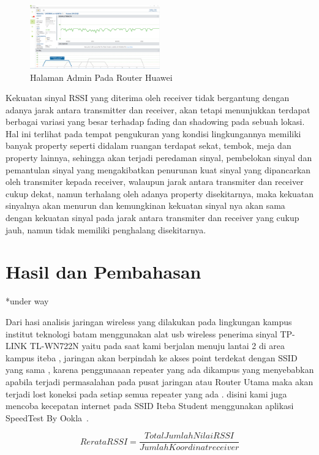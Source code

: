 \documentclass[conference]{IEEEtran}
\begin{document}
\begin{figure}[h]
    \centering
    \includegraphics[width=0.5\textwidth]{signal-strengh.png}
    \caption{Halaman Admin Pada Router Huawei}
\end{figure}

Kekuatan sinyal RSSI yang diterima oleh
receiver tidak bergantung dengan  adanya jarak
antara transmitter dan receiver, akan tetapi
menunjukkan terdapat berbagai variasi yang besar terhadap fading
dan shadowing pada sebuah lokasi. Hal ini
terlihat pada tempat pengukuran yang kondisi
lingkungannya memiliki banyak property seperti
didalam ruangan terdapat sekat, tembok, meja dan 
property lainnya, sehingga akan terjadi peredaman sinyal, pembelokan sinyal dan pemantulan
sinyal yang mengakibatkan penurunan kuat
sinyal yang dipancarkan oleh transmiter kepada
receiver, walaupun jarak antara transmiter dan
receiver cukup dekat, namun terhalang oleh
adanya property disekitarnya, maka kekuatan
sinyalnya akan menurun dan kemungkinan
kekuatan sinyal nya akan sama dengan kekuatan
sinyal pada jarak antara transmiter dan receiver
yang cukup jauh, namun tidak memiliki
penghalang disekitarnya. 

\section{Hasil dan Pembahasan}

*under way

Dari hasi analisis jaringan wireless yang dilakukan pada lingkungan kampus
institut teknologi batam menggunakan alat usb wireless penerima sinyal TP-LINK TL-WN722N yaitu pada saat kami berjalan menuju lantai 2 di area kampus iteba , jaringan akan berpindah
ke akses point terdekat dengan SSID yang sama , karena penggunaaan repeater yang ada dikampus yang menyebabkan apabila terjadi permasalahan
pada pusat jaringan atau Router Utama maka akan terjadi lost koneksi pada setiap semua repeater yang ada .
disini kami juga mencoba kecepatan internet pada SSID Iteba Student menggunakan aplikasi SpeedTest By Ookla~\cite{Ookla}.

\begin{equation}
    Rerata RSSI = \frac{Total Jumlah Nilai RSSI}{Jumlah Koordinat receiver}
    \label{rerata_rssi}
\end{equation}
\end{document}
